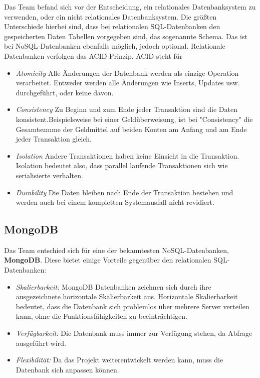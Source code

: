 Das Team befand sich vor der Entscheidung, ein relationales Datenbanksystem zu verwenden, oder ein nicht relationales Datenbanksystem.
Die größten Unterschiede hierbei sind, dass bei relationalen SQL-Datenbanken den gespeicherten Daten Tabellen vorgegeben sind, das sogenannte Schema. Das ist bei NoSQL-Datenbanken ebenfalls möglich, jedoch optional.
Relationale Datenbanken verfolgen das ACID-Prinzip. ACID steht für

\begin{itemize}
  \item \textit{Atomicity}
  \subitem Alle Änderungen der Datenbank werden als einzige Operation verarbeitet. Entweder werden alle Änderungen wie Inserts, Updates usw. durchgeführt, oder keine davon.
  \item \textit{Consistency}
  \subitem Zu Beginn und zum Ende jeder Transaktion sind die Daten konsistent.Beispielsweise bei einer Geldüberweisung, ist bei "Consistency" die Gesamtsumme der Geldmittel auf beiden Konten am Anfang und am Ende jeder Transaktion gleich.
  \item \textit{Isolation}
  \subitem Andere Transaktionen haben keine Einsicht in die Transaktion. Isolation bedeutet also, dass parallel laufende Transaktionen sich wie serialisierte verhalten.
  \item \textit{Durability}
  \subitem Die Daten bleiben nach Ende der Transaktion bestehen und werden auch bei einem kompletten Systemausfall nicht revidiert.
\end{itemize}
\cite{ACID}

\subsection{MongoDB}
Das Team entschied sich für eine der bekanntesten NoSQL-Datenbanken, \textbf{MongoDB}. Diese bietet einige Vorteile gegenüber den relationalen SQL-Datenbanken:

\begin{itemize}
  \item \textit{Skalierbarkeit: } MongoDB Datenbanken zeichnen sich durch ihre ausgezeichnete horizontale Skalierbarkeit aus. Horizontale Skalierbarkeit bedeutet, dass die Datenbank sich problemlos über mehrere Server verteilen kann, ohne die Funktionsfähigkeiten zu beeinträchtigen.
  \item \textit{Verfügbarkeit: } Die Datenbank muss immer zur Verfügung stehen, da  Abfrage ausgeführt wird.
  \item \textit{Flexibilität: } Da das Projekt weiterentwickelt werden kann, muss die Datenbank sich anpassen können.
\end{itemize}
\cite{VorteileMongoDB}
